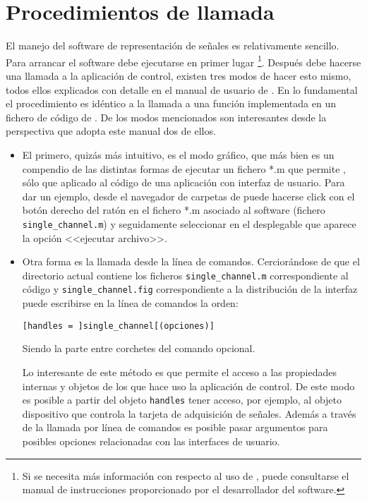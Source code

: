 \section{Procedimientos de llamada}

El manejo del software de representación de señales es relativamente
sencillo. Para arrancar el software debe ejecutarse en primer lugar
\matlab{}\footnote{Si se necesita más información con respecto al uso de
\matlab{}, puede consultarse el manual de instrucciones proporcionado por
el desarrollador del software.}. Después debe hacerse una llamada a la
aplicación de control, existen tres modos de hacer esto mismo, todos ellos
explicados con detalle en el manual de usuario de \matlab{}. En lo
fundamental el procedimiento es idéntico a la llamada a una función
implementada en un fichero de código de \matlab{}. De los modos mencionados
son interesantes desde la perspectiva que adopta este manual dos de
ellos.

\begin{itemize}
	\item El primero, quizás más intuitivo, es el modo gráfico, que más
		bien es un compendio de las distintas formas de ejecutar un
		fichero *.m que permite \matlab{}, sólo que aplicado al
		código de una aplicación con interfaz de usuario. Para dar
		un ejemplo, desde el navegador de carpetas de \matlab{}
		puede hacerse click con el botón derecho del ratón en el
		fichero *.m asociado al software (fichero
		\texttt{single\_channel.m}) y seguidamente seleccionar en
		el desplegable que aparece la opción <<ejecutar archivo>>.
	\item Otra forma es la llamada desde la línea de comandos.
		Cerciorándose de que el directorio actual contiene los
		ficheros \texttt{single\_channel.m} correspondiente al
		código y \texttt{single\_channel.fig} correspondiente a la
		distribución de la interfaz puede escribirse en la línea de
		comandos la orden:

		\begin{lstlisting}[gobble=16]
			[handles = ]single_channel[(opciones)]
		\end{lstlisting}

		Siendo la parte entre corchetes del comando opcional.

		Lo interesante de este método es que permite el acceso a
		las propiedades internas y objetos de los que hace uso la
		aplicación de control. De este modo es posible a partir del
		objeto \texttt{handles} tener acceso, por ejemplo, al
		objeto dispositivo que controla la tarjeta de adquisición
		de señales. Además a través de la llamada por línea de
		comandos es posible pasar argumentos para posibles opciones
		relacionadas con las interfaces de usuario.
\end{itemize}


